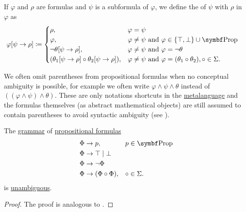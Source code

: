 \begin{definition}\label{def:propositional_substition}
  If \( \varphi \) and \( \rho \) are formulas and \( \psi \) is a subformula of \( \varphi \), we define the  of \( \psi \) with \( \rho \) in \( \varphi \) as
  \begin{align*}
    \varphi[\psi \to \rho] & \coloneqq \begin{cases}
      \rho,                                                    & \varphi = \psi                                                                        \\
      \varphi,                                                 & \varphi \neq \psi \text{ and } \varphi \in \{ \top, \bot \} \cup \Bold{Prop}          \\
      \neg \theta[\psi \to \rho],                              & \varphi \neq \psi \text{ and } \varphi = \neg \theta                                  \\
      (\theta_1[\psi \to \rho] \circ \theta_2[\psi \to \rho]), & \varphi \neq \psi \text{ and } \varphi = (\theta_1 \circ \theta_2), \circ \in \Sigma.
    \end{cases}
  \end{align*}
\end{definition}

\begin{remark}\label{remark:propositional_formula_parentheses}
  We often omit parentheses from propositional formulas when no conceptual ambiguity is possible, for example we often write \( \varphi \wedge \psi \wedge \theta \) instead of \( ((\varphi \wedge \psi) \wedge \theta) \). These are only notations shortcuts in the \hyperref[remark:metalanguage]{metalanguage} and the formulas themselves (as abstract mathematical objects) are still assumed to contain parentheses to avoid syntactic ambiguity (see ).
\end{remark}

\begin{proposition}\label{thm:propositional_formulas_are_unambiguous}
  The \hyperref[def:grammar]{grammar} of \hyperref[def:propositional_language]{propositional formulas}
  \begin{displaymath}
    \begin{aligned}
       & \Phi \to p,                 &  & p \in \Bold{Prop} \\
       & \Phi \to \top \;|\; \bot    &  &                   \\
       & \Phi \to \neg \Phi          &  &                   \\
       & \Phi \to (\Phi \circ \Phi), &  & \circ \in \Sigma.
    \end{aligned}
  \end{displaymath}
  is \hyperref[def:ambiguous_grammar]{unambiguous}.
\end{proposition}
\begin{proof}
  The proof is analogous to .
\end{proof}

